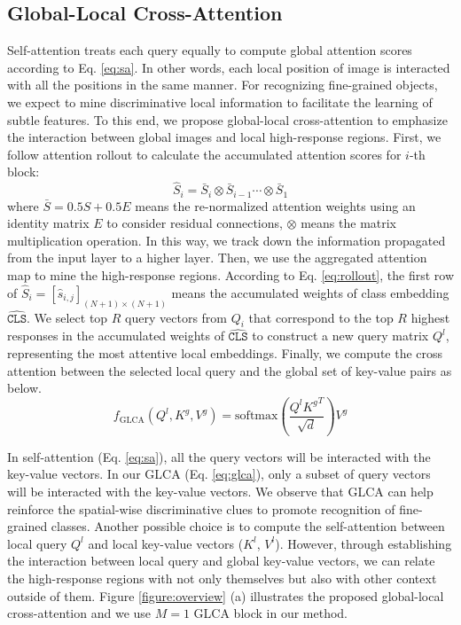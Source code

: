 \subsection{Global-Local Cross-Attention} 
Self-attention treats each query equally to compute global attention scores according to Eq. \ref{eq:sa}. In other words, each local position of image is interacted with all the positions in the same manner. For recognizing fine-grained objects, we expect to mine discriminative local information to facilitate the learning of subtle features. To this end, we propose global-local cross-attention to emphasize the interaction between global images and local high-response regions. First, we follow attention rollout \cite{abnar2020quantifying} to calculate the accumulated attention scores for $i$-th block:
\begin{equation}
    \hat{S}_i = \bar{S}_i \otimes \bar{S}_{i-1} \cdots \otimes \bar{S}_1
    \label{eq:rollout}
\end{equation}
where $\bar{S}=0.5S+0.5E$ means the re-normalized attention weights using an identity matrix $E$ to consider residual
connections, $\otimes$ means the matrix multiplication operation. In this way, we track down the information propagated
from the input layer to a higher layer. Then, we use the aggregated attention map to mine the high-response regions. According to Eq. \ref{eq:rollout}, the first row of $\hat{S}_i = [\hat{s}_{i,j}]_{(N+1)\times (N+1)}$ means the accumulated weights of class embedding $\hat{\texttt{CLS}}$. We select top $R$ query vectors from $Q_i$ that correspond to the top $R$ highest responses in the accumulated weights of $\hat{\texttt{CLS}}$ to construct a new query matrix $Q^l$, representing the most attentive local embeddings. Finally, we compute the cross attention between the selected local query and the global set of key-value pairs as below.
\begin{equation}
f_{\mbox{GLCA}}(Q^l,K^g,V^g)=\mbox{softmax}(\frac{Q^l{K^g}^T}{\sqrt{d}})V^g 
\label{eq:glca}
\end{equation}

In self-attention (Eq. \ref{eq:sa}), all the query vectors will be interacted with the key-value vectors. In our GLCA (Eq. \ref{eq:glca}), only a subset of query vectors will be interacted with the key-value vectors. We observe that GLCA can help reinforce the spatial-wise discriminative clues to promote recognition of fine-grained classes. Another possible choice is to compute the self-attention between local query $Q^l$ and local key-value vectors ($K^l$, $V^l$). However, through establishing the interaction between local query and global key-value vectors, we can relate the high-response regions with not only themselves but also with other context outside of them. Figure \ref{figure:overview} (a) illustrates the proposed global-local cross-attention and we use $M=1$ GLCA block in our method. 


